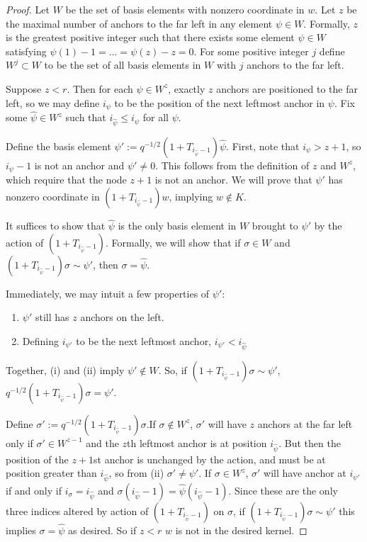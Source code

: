 \documentclass{amsart}
\begin{document}
\begin{proof}
	Let $W$ be the set of basis elements with nonzero coordinate in $w$. Let $z$ be the maximal number of anchors to the far left in any element $\psi\in W$. Formally, $z$ is the greatest positive integer such that there exists some element $\psi\in W$ satisfying $\psi(1)-1=...=\psi(z)-z=0$. For some positive integer $j$ define $W^j\subset W$ to be the set of all basis elements in $W$ with $j$ anchors to the far left.
	
	Suppose $z<r$. Then for each $\psi\in W^z$, exactly $z$ anchors are positioned to the far left, so we may define $i_\psi$ to be the position of the next leftmost anchor in $\psi$. Fix some $\widehat{\psi}\in W^z$ such that $i_{\widehat{\psi}}\leq i_\psi$ for all $\psi$.
	
	Define the basis element $\psi':=q^{-1/2}(1+T_{i_{\widehat{\psi}}-1})\widehat{\psi}$. First, note that $i_\psi>z+1$, so $i_\psi-1$ is not an anchor and $\psi'\not=0$. This follows from the definition of $z$ and $W^z$, which require that the node $z+1$ is not an anchor. We will prove that $\psi'$ has nonzero coordinate in $(1+T_{i_{\widehat{\psi}}-1})w$, implying $w\not\in K$. 
	
	It suffices to show that $\widehat{\psi}$ is the only basis element in $W$ brought to $\psi'$ by the action of $(1+T_{i_{\widehat{\psi}}-1})$. Formally, we will show that if $\sigma\in W$ and $(1+T_{i_{\widehat{\psi}}-1})\sigma\sim \psi'$, then $\sigma=\widehat{\psi}$. 
	
	Immediately, we may intuit a few properties of $\psi'$:
	\begin{enumerate}[label={(\roman*)}]
		\item $\psi'$ still has $z$ anchors on the left.
		\item Defining $i_{\psi'}$ to be the next leftmost anchor, $i_{\psi'}<i_{\widehat{\psi}}$
	\end{enumerate}
	
	Together, (i) and (ii) imply $\psi'\not\in W$. So, if $(1+T_{i_{\widehat{\psi}}-1})\sigma\sim \psi'$, $q^{-1/2}(1+T_{i_{\widehat{\psi}}-1})\sigma=\psi'$.
	
	Define $\sigma':=q^{-1/2}(1+T_{i_{\widehat{\psi}}-1})\sigma$.If $\sigma\not\in W^z$, $\sigma'$ will have $z$ anchors at the far left only if $\sigma'\in W^{z-1}$ and the $z$th leftmost anchor is at position $i_{\widehat{\psi}}$. But then the position of the $z+1$st anchor is unchanged by the action, and must be at position greater than $i_{\widehat{\psi}}$, so from (ii) $\sigma'\not=\psi'$. If $\sigma\in W^z$, $\sigma'$ will have anchor at $i_{\psi'}$ if and only if $i_\sigma=i_{\widehat{\psi}}$ and $\sigma(i_{\widehat{\psi}}-1)=\widehat{\psi}(i_{\widehat{\psi}}-1)$. Since these are the only three indices altered by action of $(1+T_{i_{\widehat{\psi}}-1})$ on $\sigma$, if $(1+T_{i_{\widehat{\psi}}-1})\sigma\sim \psi'$ this implies $\sigma=\widehat{\psi}$ as desired. So if $z<r$ $w$ is not in the desired kernel.
	

\end{proof}
\end{document}
